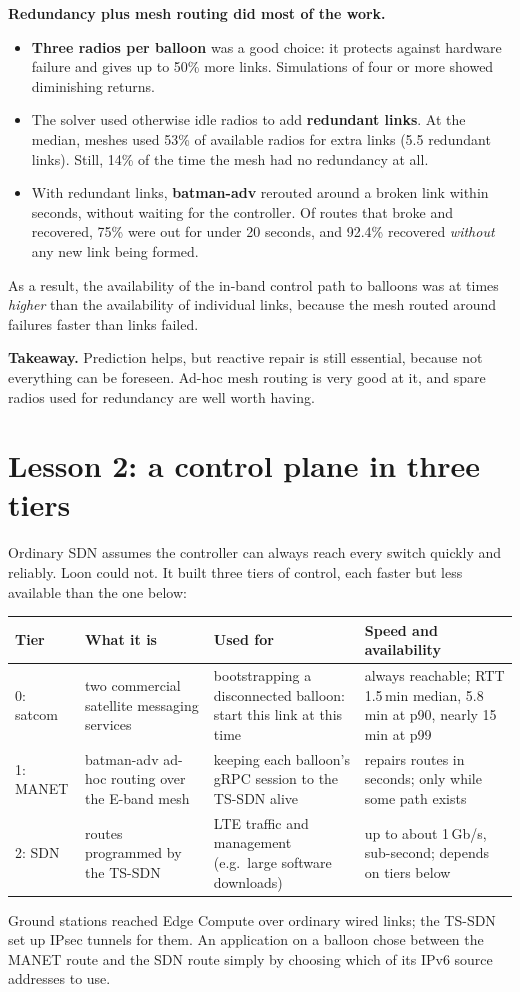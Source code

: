 \textbf{Redundancy plus mesh routing did most of the work.}
\begin{itemize}
  \item \textbf{Three radios per balloon} was a good choice: it protects against hardware failure and gives up to 50\% more links. Simulations of four or more showed
        diminishing returns.
  \item The solver used otherwise idle radios to add \textbf{redundant links}. At the median, meshes used 53\% of available radios for extra links (5.5 redundant links). Still,
        14\% of the time the mesh had no redundancy at all.
  \item With redundant links, \textbf{batman-adv} rerouted around a broken link within seconds, without waiting for the controller. Of routes that broke and recovered, 75\% were
        out for under 20 seconds, and 92.4\% recovered \emph{without} any new link being formed.
\end{itemize}
As a result, the availability of the in-band control path to balloons was at times \emph{higher} than the availability of individual links, because the mesh routed around
failures faster than links failed.

\textbf{Takeaway.} Prediction helps, but reactive repair is still essential, because not everything can be foreseen. Ad-hoc mesh routing is very good at it, and spare radios
used for redundancy are well worth having.

\section{Lesson 2: a control plane in three tiers}

Ordinary SDN assumes the controller can always reach every switch quickly and reliably. Loon could not. It built three tiers of control, each faster but less available than
the one below:
\begin{center}
\begin{tabularx}{\linewidth}{@{}lXXX@{}}
\toprule
Tier & What it is & Used for & Speed and availability\\
\midrule
0: satcom & two commercial satellite messaging services & bootstrapping a disconnected balloon: start this link at this time & always reachable; RTT 1.5\,min median, 5.8\,min at p90, nearly 15\,min at p99\\
1: MANET & batman-adv ad-hoc routing over the E-band mesh & keeping each balloon's gRPC session to the TS-SDN alive & repairs routes in seconds; only while some path exists\\
2: SDN & routes programmed by the TS-SDN & LTE traffic and management (e.g.\ large software downloads) & up to about 1\,Gb/s, sub-second; depends on tiers below\\
\bottomrule
\end{tabularx}
\end{center}
Ground stations reached Edge Compute over ordinary wired links; the TS-SDN set up IPsec tunnels for them. An application on a balloon chose between the MANET route and the
SDN route simply by choosing which of its IPv6 source addresses to use.

